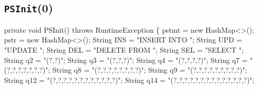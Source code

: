 \documentclass{article}
\theoremstyle{definition}
\begin{document}
\subsection{{\tt{}\protect{}PSInit}(0)}
\nwenddocs{}\endmoddef{}
private void PSInit() throws RuntimeException \{
  pstmt = new HashMap<>();
  pstr = new HashMap<>();
  String INS = "INSERT INTO ";
  String UPD = "UPDATE ";
  String DEL = "DELETE FROM ";
  String SEL = "SELECT ";
  String q2  = "(?,?)";
  String q3  = "(?,?,?)";
  String q4  = "(?,?,?,?)";
  String q7  = "(?,?,?,?,?,?,?)";
  String q8  = "(?,?,?,?,?,?,?,?)";
  String q9  = "(?,?,?,?,?,?,?,?,?)";
  String q12 = "(?,?,?,?,?,?,?,?,?,?,?,?)";
  String q14 = "(?,?,?,?,?,?,?,?,?,?,?,?,?,?)";
\end{document}
